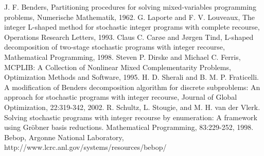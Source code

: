 \begin{thebibliography}{9}
    J. F. Benders, Partitioning procedures for solving mixed-variables programming problems, Numerische Mathematik, 1962.
	G. Laporte and F. V. Louveaux, The integer L-shaped method for stochastic integer programs with complete recourse, Operations Research Letters, 1993.
	Claus C. Car\o e and J\o rgen Tind, L-shaped decomposition of two-stage stochastic programs with integer recourse, Mathematical Programming, 1998.
	Steven P. Dirske and Michael C. Ferris, MCPLIB: A Collection of Nonlinear Mixed Complementarity Problems, Optimization Methods and Software, 1995.
	H. D. Sherali and B. M. P. Fraticelli. A modification of Benders decomposition algorithm for discrete subproblems: An approach for stochastic programs with integer recourse, Journal of Global Optimization, 22:319-342, 2002.
	R. Schultz, L. Stougie, and M. H. van der Vlerk. Solving stochastic programs with integer recourse by enumeration: A framework using Gröbner basis reductions. Mathematical Programming, 83:229-252, 1998.
	Bebop, Argonne National Laboratory, http://www.lcrc.anl.gov/systems/resources/bebop/
\end{thebibliography}